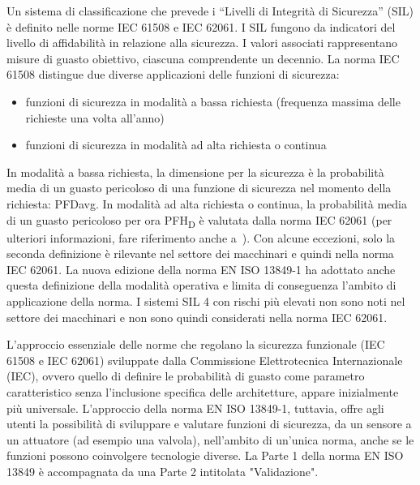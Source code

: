 Un sistema di classificazione che prevede i “Livelli di Integrità di Sicurezza” (SIL) è definito nelle norme IEC 61508 e IEC 62061. I SIL fungono da indicatori del livello di affidabilità in relazione alla sicurezza. I valori associati rappresentano misure di guasto obiettivo, ciascuna comprendente un decennio. La norma IEC 61508 distingue due diverse applicazioni delle funzioni di sicurezza:
\begin{itemize}
    \item funzioni di sicurezza in modalità a bassa richiesta (frequenza massima delle richieste una volta all'anno)
    \item funzioni di sicurezza in modalità ad alta richiesta o continua
\end{itemize}
In modalità a bassa richiesta, la dimensione per la sicurezza è la probabilità media di un guasto pericoloso di una funzione di sicurezza nel momento della richiesta: PFDavg. In modalità ad alta richiesta o continua, la probabilità media di un guasto pericoloso per ora PFH\textsubscript{D} è valutata dalla norma IEC 62061 (per ulteriori informazioni, fare riferimento anche a~\cite{boemer2014}). Con alcune eccezioni, solo la seconda definizione è rilevante nel settore dei macchinari e quindi nella norma IEC 62061. La nuova edizione della norma EN ISO 13849-1 ha adottato anche questa definizione della modalità operativa e limita di conseguenza l'ambito di applicazione della norma. I sistemi SIL 4 con rischi più elevati non sono noti nel settore dei macchinari e non sono quindi considerati nella norma IEC 62061.
\begin{center}
    \begin{minipage}{\textwidth}
        \centering
        \captionsetup{hypcap=false}
        \resizebox{0.92\textwidth}{!}{}
        \label{fig:03-02}
    \end{minipage}
\end{center}
L'approccio essenziale delle norme che regolano la sicurezza funzionale (IEC 61508 e IEC 62061) sviluppate dalla Commissione Elettrotecnica Internazionale (IEC), ovvero quello di definire le probabilità di guasto come parametro caratteristico senza l'inclusione specifica delle architetture, appare inizialmente più universale. L'approccio della norma EN ISO 13849-1, tuttavia, offre agli utenti la possibilità di sviluppare e valutare funzioni di sicurezza, da un sensore a un attuatore (ad esempio una valvola), nell'ambito di un'unica norma, anche se le funzioni possono coinvolgere tecnologie diverse. La Parte 1 della norma EN ISO 13849 è accompagnata da una Parte 2 intitolata "Validazione".


